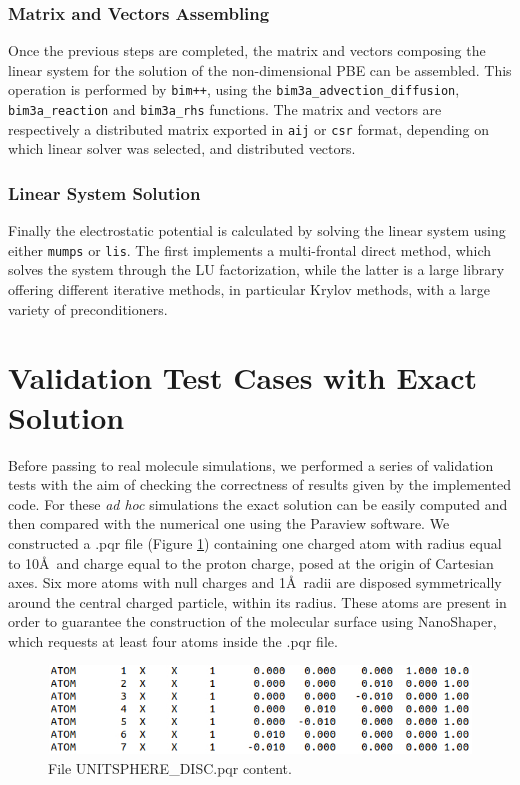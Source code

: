 \documentclass[11pt,a4paper]{article}
\begin{document}
\subsubsection{Matrix and Vectors Assembling}
Once the previous steps are completed, the matrix and vectors composing the linear system for the solution of the non-dimensional PBE can be assembled. This operation is performed by \texttt{bim++}, using the \texttt{bim3a\_advection\_diffusion}, \texttt{bim3a\_reaction} and \texttt{bim3a\_rhs} functions. The matrix and vectors are respectively a distributed matrix exported in \texttt{aij} or \texttt{csr} format, depending on which linear solver was selected, and distributed vectors. 
\subsubsection{Linear System Solution}
Finally the electrostatic potential is calculated by solving the linear system using either \texttt{mumps} or \texttt{lis}. The first implements a multi-frontal direct method, which solves the system through the LU factorization, while the latter is a large library offering different iterative methods, in particular Krylov methods, with a large variety of preconditioners. 

\section{Validation Test Cases with Exact Solution}
Before passing to real molecule simulations, we  performed a series of validation tests with the aim of checking the correctness of results given by the implemented code. For these \emph{ad hoc} simulations the exact solution can be easily computed and then compared with the numerical one using the Paraview software. We constructed a .pqr file (Figure \ref{fig:valid_pqr}) containing one charged atom with radius equal to 10\AA\ and charge equal to the proton charge, posed at the origin of Cartesian axes. Six more atoms with null charges and 1\AA\ radii are disposed symmetrically around the central charged particle, within its radius. These atoms are present in order to guarantee the construction of the molecular surface using NanoShaper, which requests at least four atoms inside the .pqr file. 

\begin{figure}[H]
    \centering
    \includegraphics[scale = 0.5 ]{Images/valid_pqr.jpg}
    \caption{File UNITSPHERE\_DISC.pqr content.}
    \label{fig:valid_pqr}
\end{figure}
\end{document}
